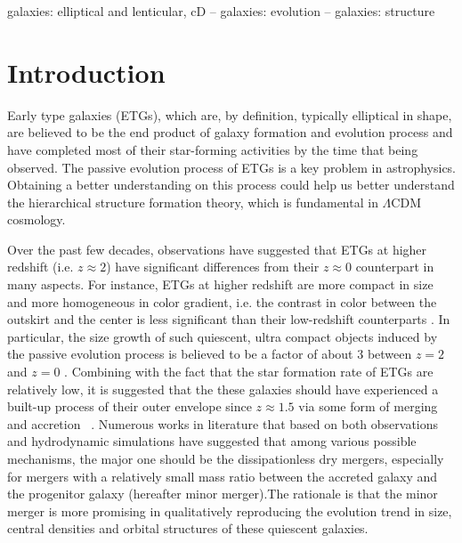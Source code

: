 \documentclass[fleqn,usenatbib]{mnras}
\begin{document}
\begin{keywords}
    galaxies: elliptical and lenticular, cD -- galaxies: evolution -- galaxies: structure
\end{keywords}



\section{Introduction}
Early type galaxies (ETGs), which are, by definition, typically elliptical in shape, are believed to be the end product of galaxy formation and evolution process and have completed most of their star-forming activities by the time that being observed. The passive evolution process of ETGs is a key problem in astrophysics. Obtaining a better understanding on this process could help us better understand the hierarchical structure formation theory, which is fundamental in $\Lambda$CDM cosmology.
\par Over the past few decades, observations have suggested that ETGs at higher redshift (i.e. $z\approx 2$) have significant differences from their $z \approx 0 $ counterpart in many aspects. For instance, ETGs at higher redshift are more compact in size \citep[e.g.][]{daddiPassivelyEvolvingEarlyType2005, toft2007, trujillo2006, trujillo2007, vandokkum2008} and more homogeneous in color gradient, i.e. the contrast in color between the outskirt and the center is less significant than their low-redshift counterparts
 \citep[e.g.][]{Suess2019a,Suess2019b,Suess2020}. 
In particular, the size growth of such quiescent, ultra compact objects induced by the passive evolution process is believed to be a factor of about 3 between $z = 2$ and $z = 0$ \citep[e.g.][]{fan_dramatic_2008,  van_dokkum_growth_2010,vanderwel3DHSTCANDELSEvolution2014,damjanov2019,hamadouche2022}.
 Combining with the fact that the star formation rate of ETGs are relatively low, it is suggested that the these galaxies should have experienced a built-up process of their outer envelope since $z \approx 1.5$ via some form of merging and accretion~\citep[e.g.][]{hopkins2009,hopkins2010,van_dokkum_growth_2010} . Numerous works in literature that based on both observations and hydrodynamic simulations have suggested that among various possible mechanisms, the major one should be the dissipationless dry mergers, especially for mergers with a relatively small mass ratio between the accreted galaxy and the progenitor galaxy (hereafter minor merger).The rationale is that the minor merger is more promising in qualitatively reproducing the evolution trend in size, central densities and orbital structures of these quiescent galaxies.
\end{document}
